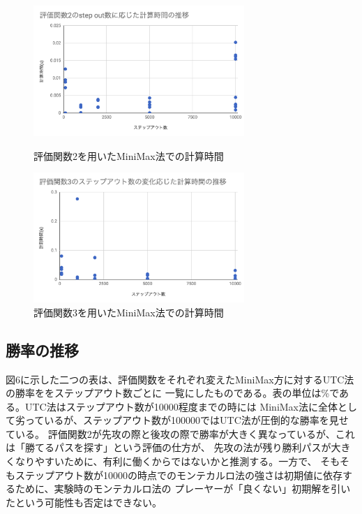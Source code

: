 \documentclass[uplatex]{jsarticle}
\begin{document}
\begin{figure}[htbp]
\begin{minipage}{0.5\hsize}
 \begin{center}
  \includegraphics[width=80mm]{img/calc_time_3.png}
 \end{center}
 \caption{評価関数2を用いたMiniMax法での計算時間}
 \label{fig:one}
\end{minipage}
\begin{minipage}{0.5\hsize}
 \begin{center}
  \includegraphics[width=80mm]{img/calc_time_4.png}
 \end{center}
 \caption{評価関数3を用いたMiniMax法での計算時間}
 \label{fig:two}
\end{minipage}
\end{figure}

\subsection{勝率の推移}
図6に示した二つの表は、評価関数をそれぞれ変えたMiniMax方に対するUTC法の勝率ををステップアウト数ごとに
一覧にしたものである。表の単位は\%である。UTC法はステップアウト数が10000程度までの時には
MiniMax法に全体として劣っているが、ステップアウト数が100000ではUTC法が圧倒的な勝率を見せている。
評価関数2が先攻の際と後攻の際で勝率が大きく異なっているが、これは「勝てるパスを探す」という評価の仕方が、
先攻の法が残り勝利パスが大きくなりやすいために、有利に働くからではないかと推測する。一方で、
そもそもステップアウト数が10000の時点でのモンテカルロ法の強さは初期値に依存するために、実験時のモンテカルロ法の
プレーヤーが「良くない」初期解を引いたという可能性も否定はできない。
\end{document}
